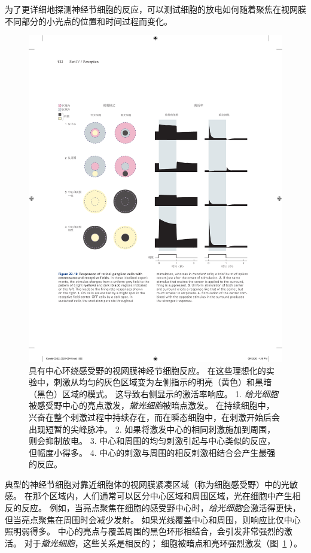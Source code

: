 为了更详细地探测神经节细胞的反应，可以测试细胞的放电如何随着聚焦在视网膜不同部分的小光点的位置和时间过程而变化。


\begin{figure}[htbp]
	\centering
	\includegraphics[width=1.0\linewidth]{chap22/fig_22_10}
	\caption{具有中心环绕感受野的视网膜神经节细胞反应。 
		在这些理想化的实验中，刺激从均匀的灰色区域变为左侧指示的明亮（黄色）和黑暗（黑色）区域的模式。 这导致右侧显示的激活率响应。 
		1. \textit{给光细胞}被感受野中心的亮点激发，\textit{撤光细胞}被暗点激发。
		在持续细胞中，兴奋在整个刺激过程中持续存在，而在瞬态细胞中，在刺激开始后会出现短暂的尖峰脉冲。 
		2. 如果将激发中心的相同刺激施加到周围，则会抑制放电。 
		3. 中心和周围的均匀刺激引起与中心类似的反应，但幅度小得多。 
		4. 中心的刺激与周围的相反刺激相结合会产生最强的反应。}
	\label{fig:22_10}
\end{figure}


典型的神经节细胞对靠近细胞体的视网膜紧凑区域（称为细胞感受野）中的光敏感。
在那个区域内，人们通常可以区分中心区域和周围区域，光在细胞中产生相反的反应。
例如，当亮点聚焦在细胞的感受野中心时，\textit{给光细胞}会激活得更快，但当亮点聚焦在周围时会减少发射。
如果光线覆盖中心和周围，则响应比仅中心照明弱得多。 
中心的亮点与覆盖周围的黑色环形相结合，会引发非常强烈的激活。
对于\textit{撤光细胞}，这些关系是相反的；
细胞被暗点和亮环强烈激发（图~\ref{fig:22_10} ）。



